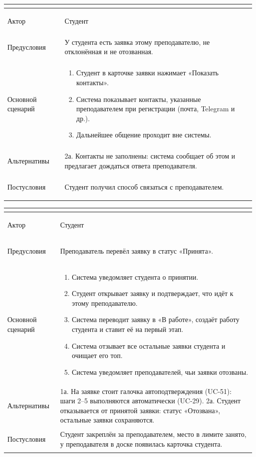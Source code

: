 \documentclass[a4paper,12pt]{article}
\newenvironment{ucd}[3]{%
  \needspace{10\baselineskip}
  \begin{longtable}{|>{\bfseries\raggedright\arraybackslash}p{3.0cm}|p{11.8cm}|}
  \hline
  \multicolumn{2}{|l|}{\textbf{#1.\ #2}}\\ \hline
  Актор & #3\\ \hline
}{\end{longtable}}
\newcommand{\steps}[1]{\begin{enumerate}[nosep,leftmargin=*]#1\end{enumerate}}
\begin{document}
\begin{ucd}{UC-5}{Запросить контакты преподавателя}{Студент}
Предусловия & У студента есть заявка этому преподавателю, не отклонённая и не отозванная.\\ \hline
Основной сценарий & \steps{
 \item Студент в карточке заявки нажимает «Показать контакты».
 \item Система показывает контакты, указанные преподавателем при регистрации (почта, Telegram и др.).
 \item Дальнейшее общение проходит вне системы.}\\ \hline
Альтернативы & 2а. Контакты не заполнены: система сообщает об этом и предлагает дождаться ответа преподавателя.\\ \hline
Постусловия & Студент получил способ связаться с преподавателем.\\ \hline
\end{ucd}

\begin{ucd}{UC-6}{Подтвердить принятие заявки преподавателем}{Студент}
Предусловия & Преподаватель перевёл заявку в статус «Принята».\\ \hline
Основной сценарий & \steps{
 \item Система уведомляет студента о принятии.
 \item Студент открывает заявку и подтверждает, что идёт к этому преподавателю.
 \item Система переводит заявку в «В работе», создаёт работу студента и ставит её на первый этап.
 \item Система отзывает все остальные заявки студента и очищает его топ.
 \item Система уведомляет преподавателей, чьи заявки отозваны.}\\ \hline
Альтернативы & 1а. На заявке стоит галочка автоподтверждения (UC-51): шаги 2--5 выполняются автоматически (UC-29).\newline
2а. Студент отказывается от принятой заявки: статус «Отозвана», остальные заявки сохраняются.\\ \hline
Постусловия & Студент закреплён за преподавателем, место в лимите занято, у преподавателя в доске появилась карточка студента.\\ \hline
\end{ucd}
\end{document}

